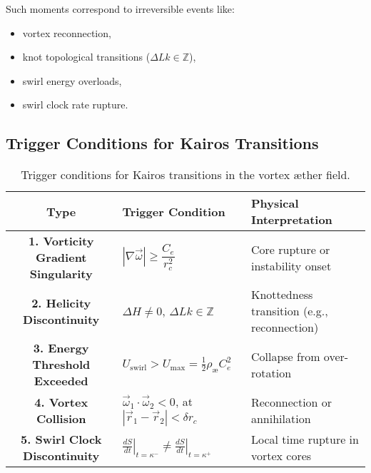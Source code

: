 \documentclass[12pt]{article}
\begin{document}
    Such moments correspond to irreversible events like:
    \begin{itemize}
        \item vortex reconnection,
        \item knot topological transitions (\( \Delta Lk \in \mathbb{Z} \)),
        \item swirl energy overloads,
        \item swirl clock rate rupture.
    \end{itemize}

    \subsection*{Trigger Conditions for Kairos Transitions}

    \begin{table}[H]
        \centering
        \footnotesize
        \renewcommand{\arraystretch}{1.3}
        \begin{tabular}{|c|p{6cm}|p{6cm}|}
            \hline
            \textbf{Type} & \textbf{Trigger Condition} & \textbf{Physical Interpretation} \\
            \hline
            \textbf{1. Vorticity Gradient Singularity} &
            $|\nabla \vec{\omega}| \geq \dfrac{C_e}{r_c^2}$ &
            Core rupture or instability onset \\
            \textbf{2. Helicity Discontinuity} &
            $\Delta H \neq 0$, $\Delta Lk \in \mathbb{Z}$ &
            Knottedness transition (e.g., reconnection) \\
            \textbf{3. Energy Threshold Exceeded} &
            $U_{\text{swirl}} > U_{\text{max}} = \frac{1}{2} \rho_{\text{\ae}} C_e^2$ &
            Collapse from over-rotation \\
            \textbf{4. Vortex Collision} &
            $\vec{\omega}_1 \cdot \vec{\omega}_2 < 0$, at $|\vec{r}_1 - \vec{r}_2| < \delta r_c$ &
            Reconnection or annihilation \\
            \textbf{5. Swirl Clock Discontinuity} &
            $\left.\frac{dS}{dt}\right|_{t = \kappa^-} \neq \left.\frac{dS}{dt}\right|_{t = \kappa^+}$ &
            Local time rupture in vortex cores \\
            \hline
        \end{tabular}
        \caption{Trigger conditions for Kairos transitions in the vortex æther field.}
    \end{table}
\end{document}
